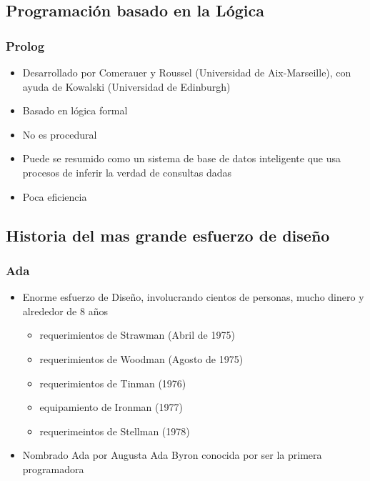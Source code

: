 \documentclass[11pt]{article}
\begin{document}
\subsection*{Programación basado en la Lógica}
\label{sec:orgheadline90}

\subsubsection*{Prolog}
\label{sec:orgheadline89}
\begin{itemize}
\item Desarrollado por Comerauer y Roussel (Universidad de Aix-Marseille),
con ayuda de Kowalski (Universidad de Edinburgh)
\item Basado en lógica formal
\item No es procedural
\item Puede se resumido como un sistema de base de datos inteligente que
usa procesos de inferir la verdad de consultas dadas
\item Poca eficiencia
\end{itemize}

\subsection*{Historia del mas grande esfuerzo de diseño}
\label{sec:orgheadline94}

\subsubsection*{Ada}
\label{sec:orgheadline91}
\begin{itemize}
\item Enorme esfuerzo de Diseño, involucrando cientos de personas, mucho
dinero y alrededor de 8 años
\begin{itemize}
\item requerimientos de Strawman (Abril de 1975)
\item requerimientos de Woodman (Agosto de 1975)
\item requerimientos de Tinman (1976)
\item equipamiento de Ironman (1977)
\item requerimeintos de Stellman (1978)
\end{itemize}
\item Nombrado Ada por Augusta Ada Byron conocida por ser la primera programadora
\end{itemize}
\end{document}
